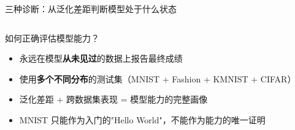\documentclass[aspectratio=169]{ctexbeamer}
\begin{document}
\begin{frame}[shrink=20]{三种诊断：从泛化差距判断模型处于什么状态}
\begin{columns}[T]
\vspace{0.1cm}

\begin{exampleblock}{如何正确评估模型能力？}
\footnotesize
\begin{itemize}
  \item 永远在模型\textbf{从未见过}的数据上报告最终成绩
  \item 使用\textbf{多个不同分布}的测试集（MNIST + Fashion + KMNIST + CIFAR）
  \item 泛化差距 + 跨数据集表现 = 模型能力的完整画像
  \item MNIST 只能作为入门的"Hello World"，不能作为能力的唯一证明
\end{itemize}
\end{exampleblock}
\end{columns}
\end{frame}
\end{document}
